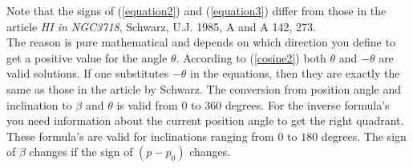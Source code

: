 \documentclass[11pt,a4paper]{article}
\begin{document}
Note that the signs of (\ref{equation2}) and (\ref{equation3}) differ from those in 
the article {\it HI in NGC3718}, Schwarz, U.J. 1985, A and A 142, 273.\\
The reason is pure mathematical and depends on which direction you define to
get a positive value for the angle $\theta$.
According to (\ref{cosine2}) both $\theta$ and
$-\theta$ are valid solutions. If one substitutes $-\theta$ in the equations, then
they are exactly the same as those in the article by Schwarz.
The conversion from position angle and inclination to $\beta$ and $\theta$ is 
valid from $0$ to $360$
degrees. For the inverse formula's you need information about the current position 
angle to get the right quadrant. These formula's are valid for inclinations
ranging from $0$ to $180$ degrees. The sign of $\beta$ changes if the sign of $(p-p_0)$
changes.
\pagebreak


 
\end{document}
